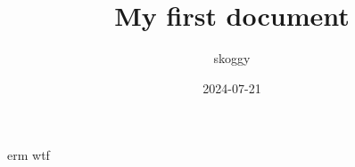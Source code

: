 \documentclass{article}
\title{My first document}
\date{2024-07-21}
\author{skoggy}
\begin{document}
    \newpage

    erm wtf
\end{document}
